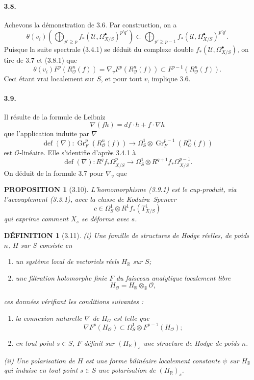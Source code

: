 \documentclass[10pt]{article}
\newcommand{\R}{\mathbb R}
\newcommand{\cO}{\mathcal O}
\newcommand{\cU}{\mathcal U}
\newcommand{\Gr}{\operatorname{Gr}}
\theoremstyle{deligne}
\newtheorem*{definition}{DÉFINITION}
\newtheorem*{proposition}{PROPOSITION}
\begin{document}
\paragraph{3.8.}
Achevons la démonstration de 3.6. Par construction, on a
\begin{equation}
\theta(v_i)\left(\bigoplus_{p'\ge p} f_*(\cU,\Omega^\bullet_{X/S})^{p'q'}\right)
\subset
\bigoplus_{p'\ge p-1} f_*(\cU,\Omega^\bullet_{X/S})^{p'q'} .
\tag{3.8.1}
\end{equation}
Puisque la suite spectrale (3.4.1) se déduit du complexe double $f_*(\cU,\Omega^\bullet_{X/S})$, on tire de 3.7 et (3.8.1) que
\begin{equation}
\theta(v_i)F^p(R_\cO^n(f))=\nabla_vF^p(R_\cO^n(f))\subset F^{p-1}(R_\cO^n(f)).
\tag{3.8.2}
\end{equation}
Ceci étant vrai localement sur $S$, et pour tout $v$, implique 3.6.

\paragraph{3.9.}
Il résulte de la formule de Leibniz
\[
\nabla(fh)=df\cdot h+f\cdot \nabla h
\]
que l'application induite par $\nabla$
\[
\operatorname{def}(\nabla):\Gr_F^p(R_\cO^n(f))\longrightarrow
\Omega_S^1\otimes\Gr_F^{p-1}(R_\cO^n(f))
\]
est $\cO$-linéaire. Elle s'identifie d'après 3.4.1 à
\begin{equation}
\operatorname{def}(\nabla):R^qf_*\Omega^p_{X/S}\longrightarrow
\Omega_S^1\otimes R^{q+1}f_*\Omega^{p-1}_{X/S}.
\tag{3.9.1}
\end{equation}
On déduit de la formule 3.7 pour $\nabla_v$ que

\begin{proposition}[3.10]
L'homomorphisme (3.9.1) est le cup-produit, via l'accouplement (3.3.1), avec la classe de Kodaira--Spencer
\[
c\in\Omega_S^1\otimes R^1f_*(T^1_{X/S})
\]
qui exprime comment $X_s$ se déforme avec $s$.
\end{proposition}

\begin{definition}[3.11]
(i) Une famille de structures de Hodge réelles, de poids $n$, $H$ sur $S$ consiste en
\begin{enumerate}[label=\alph*)]
\item un système local de vectoriels réels $H_\R$ sur $S$;
\item une filtration holomorphe finie $F$ du faisceau analytique localement libre
\[
H_\cO=H_\R\otimes_\R\cO,
\]
\end{enumerate}
ces données vérifiant les conditions suivantes :
\begin{enumerate}[label=(H.\arabic*)]
\item la connexion naturelle $\nabla$ de $H_\cO$ est telle que
\[
\nabla F^p(H_\cO)\subset \Omega_S^1\otimes F^{p-1}(H_\cO);
\]
\item en tout point $s\in S$, $F$ définit sur $(H_\R)_s$ une structure de Hodge de poids $n$.
\end{enumerate}
(ii) Une polarisation de $H$ est une forme bilinéaire localement constante $\psi$ sur $H_\R$ qui induise en tout point $s\in S$ une polarisation de $(H_\R)_s$.
\end{definition}
\end{document}
